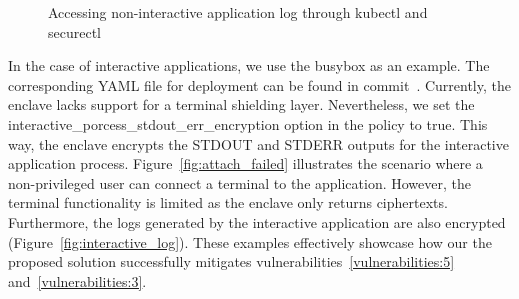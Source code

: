 \begin{figure}[!htb]

    
    
    \caption[Accessing non-interactive application log through kubectl and securectl]{Accessing non-interactive application log through kubectl and securectl}
\end{figure}

In the case of interactive applications, we use the busybox as an example. The corresponding YAML file for deployment can be found in commit~\cite*{artifacts_busybox}. Currently, the enclave lacks support for a terminal shielding layer. Nevertheless, we set the interactive\_porcess\_stdout\_err\_encryption option in the policy to true. 
This way, the enclave encrypts the STDOUT and STDERR outputs for the interactive application process. Figure~\ref{fig:attach_failed} illustrates the scenario where a non-privileged user can connect a terminal to the application. However, the terminal functionality is limited as the enclave only returns ciphertexts. 
Furthermore, the logs generated by the interactive application are also encrypted (Figure~\ref{fig:interactive_log}). These examples effectively showcase how our 
the proposed solution successfully mitigates vulnerabilities~\ref{vulnerabilities:5} and~\ref{vulnerabilities:3}.


